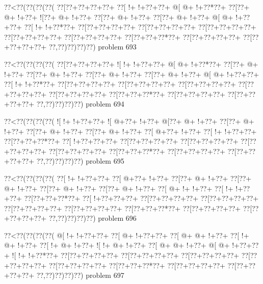 \vbox{\vbox{\goo
\0??<\0??(\0??(\0??(\0??(
\0??[\0??+\0??+\0??+\0??+
\0??[\- !+\- !+\0??+\0??+
\- @[\- @+\- !+\0??*\0??+
\0??[\0??+\- @+\- !+\0??+
\- ![\0??+\- @+\- !+\0??+
\0??[\0??+\- @+\- !+\0??+
\0??[\0??+\- @+\- !+\0??+
\- @[\- @+\- !+\0??+\0??+
\0??[\- !+\- !+\0??*\0??+
\0??[\0??+\0??+\0??+\0??+
\0??[\0??+\0??+\0??+\0??+
\0??[\0??+\0??+\0??+\0??+
\0??[\0??+\0??+\0??+\0??+
\0??[\0??+\0??+\0??+\0??+
\0??[\0??+\0??+\0??*\0??+
\0??[\0??+\0??+\0??+\0??+
\0??[\0??+\0??+\0??+\0??+
\0??,\0??)\0??)\0??)\0??)
}
\hfil problem 693\hfil\break
}

\vbox{\vbox{\goo
\0??<\0??(\0??(\0??(\0??(
\0??[\0??+\0??+\0??+\0??+
\- ![\- !+\- !+\0??+\0??+
\- @[\- @+\- !+\0??*\0??+
\0??[\0??+\- @+\- !+\0??+
\0??[\0??+\- @+\- !+\0??+
\0??[\0??+\- @+\- !+\0??+
\0??[\0??+\- @+\- !+\0??+
\- @[\- @+\- !+\0??+\0??+
\0??[\- !+\- !+\0??*\0??+
\0??[\0??+\0??+\0??+\0??+
\0??[\0??+\0??+\0??+\0??+
\0??[\0??+\0??+\0??+\0??+
\0??[\0??+\0??+\0??+\0??+
\0??[\0??+\0??+\0??+\0??+
\0??[\0??+\0??+\0??*\0??+
\0??[\0??+\0??+\0??+\0??+
\0??[\0??+\0??+\0??+\0??+
\0??,\0??)\0??)\0??)\0??)
}
\hfil problem 694\hfil\break
}

\vbox{\vbox{\goo
\0??<\0??(\0??(\0??(\0??(
\- ![\- !+\- !+\0??+\0??+
\- ![\- @+\0??+\- !+\0??+
\- @[\0??+\- @+\- !+\0??+
\0??[\0??+\- @+\- !+\0??+
\0??[\0??+\- @+\- !+\0??+
\0??[\0??+\- @+\- !+\0??+
\0??[\- @+\0??+\- !+\0??+
\0??[\- !+\- !+\0??+\0??+
\0??[\0??+\0??+\0??*\0??+
\0??[\- !+\0??+\0??+\0??+
\0??[\0??+\0??+\0??+\0??+
\0??[\0??+\0??+\0??+\0??+
\0??[\0??+\0??+\0??+\0??+
\0??[\0??+\0??+\0??+\0??+
\0??[\0??+\0??+\0??*\0??+
\0??[\0??+\0??+\0??+\0??+
\0??[\0??+\0??+\0??+\0??+
\0??,\0??)\0??)\0??)\0??)
}
\hfil problem 695\hfil\break
}

\vbox{\vbox{\goo
\0??<\0??(\0??(\0??(\0??(
\0??[\- !+\- !+\0??+\0??+
\0??[\- @+\0??+\- !+\0??+
\0??[\0??+\- @+\- !+\0??+
\0??[\0??+\- @+\- !+\0??+
\0??[\0??+\- @+\- !+\0??+
\0??[\0??+\- @+\- !+\0??+
\0??[\- @+\- !+\- !+\0??+
\0??[\- !+\- !+\0??+\0??+
\0??[\0??+\0??+\0??*\0??+
\0??[\- !+\0??+\0??+\0??+
\0??[\0??+\0??+\0??+\0??+
\0??[\0??+\0??+\0??+\0??+
\0??[\0??+\0??+\0??+\0??+
\0??[\0??+\0??+\0??+\0??+
\0??[\0??+\0??+\0??*\0??+
\0??[\0??+\0??+\0??+\0??+
\0??[\0??+\0??+\0??+\0??+
\0??,\0??)\0??)\0??)\0??)
}
\hfil problem 696\hfil\break
}

\vbox{\vbox{\goo
\0??<\0??(\0??(\0??(\0??(
\- @[\- !+\- !+\0??+\0??+
\0??[\- @+\- !+\0??+\0??+
\0??[\- @+\- @+\- !+\0??+
\0??[\- !+\- @+\- !+\0??+
\0??[\- !+\- @+\- !+\0??+
\- ![\- !+\- @+\- !+\0??+
\0??[\- @+\- @+\- !+\0??+
\- @[\- @+\- !+\0??+\0??+
\- ![\- !+\- !+\0??*\0??+
\0??[\0??+\0??+\0??+\0??+
\0??[\0??+\0??+\0??+\0??+
\0??[\0??+\0??+\0??+\0??+
\0??[\0??+\0??+\0??+\0??+
\0??[\0??+\0??+\0??+\0??+
\0??[\0??+\0??+\0??*\0??+
\0??[\0??+\0??+\0??+\0??+
\0??[\0??+\0??+\0??+\0??+
\0??,\0??)\0??)\0??)\0??)
}
\hfil problem 697\hfil\break
}


